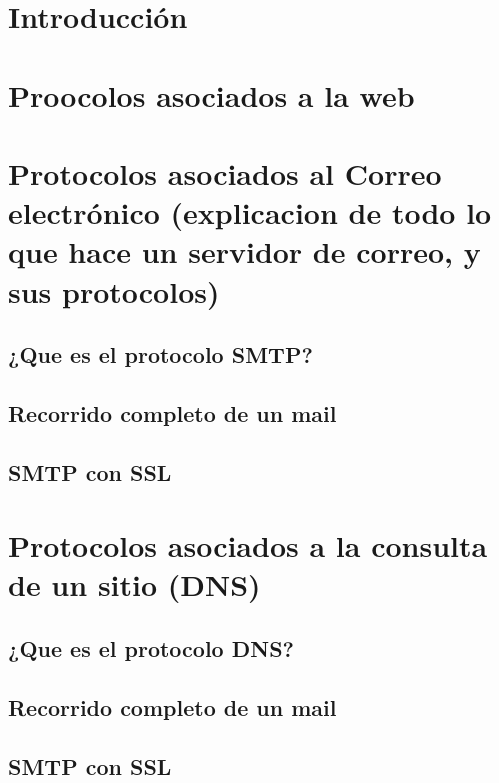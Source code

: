 
\section{Introducción}
\section{Proocolos asociados a la web}
    


\section{Protocolos asociados al Correo electrónico (explicacion de todo lo que hace un servidor de correo, y sus protocolos)}
    \subsection{¿Que es el protocolo SMTP?}
    \subsection{Recorrido completo de un mail}
    \subsection{SMTP con SSL}

\section{Protocolos asociados a la consulta de un sitio (DNS)}
    \subsection{¿Que es el protocolo DNS?} 
    \subsection{Recorrido completo de un mail}
    \subsection{SMTP con SSL}




